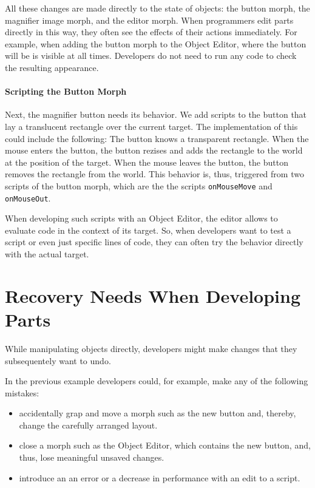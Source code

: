All these changes are made directly to the state of objects: the button morph, the magnifier image morph, and the editor morph.
When programmers edit parts directly in this way, they often see the effects of their actions immediately.
For example, when adding the button morph to the Object Editor, where the button will be is visible at all times.
Developers do not need to run any code to check the resulting appearance.

\paragraph{Scripting the Button Morph}
Next, the magnifier button needs its behavior.
We add scripts to the button that lay a translucent rectangle over the current target.
The implementation of this could include the following: The button knows a transparent rectangle. When the mouse enters the button, the button rezises and adds the rectangle to the world at the position of the target. When the mouse leaves the button, the button removes the rectangle from the world.
This behavior is, thus, triggered from two scripts of the button morph, which are the the scripts \lstinline{onMouseMove} and \lstinline{onMouseOut}.

When developing such scripts with an Object Editor, the editor allows to evaluate code in the context of its target.
So, when developers want to test a script or even just specific lines of code, they can often try the behavior directly with the actual target.


\section{Recovery Needs When Developing Parts}

While manipulating objects directly, developers might make changes that they subsequentely want to undo.

In the previous example developers could, for example, make any of the following mistakes:

\begin{itemize}
    \item accidentally grap and move a morph such as the new button and, thereby, change the carefully arranged layout.
    \item close a morph such as the Object Editor, which contains the new button, and, thus, lose meaningful unsaved changes.
    \item introduce an an error or a decrease in performance with an edit to a script.
\end{itemize}

